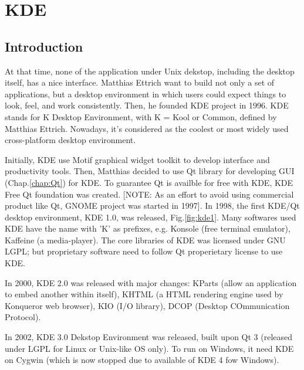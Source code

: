 \chapter{KDE}

\section{Introduction}

At that time, none of the application under Unix dekstop, including the desktop
itself, has a nice interface. Matthias Ettrich want to build not only a set of
applications, but a desktop environment in which users could expect things to
look, feel, and work consistently. Then, he founded KDE project in 1996. KDE
stands for K Desktop Environment, with K = Kool or Common, defined by Matthias
Ettrich. Nowadays, it's considered as the coolest or most widely used
cross-platform desktop environment.

Initially, KDE use Motif graphical widget toolkit to develop interface and
productivity tools. Then, Matthias decided to use Qt library for developing GUI
(Chap.\ref{chap:Qt}) for KDE. To guarantee Qt is availble for free with KDE, KDE
Free Qt foundation was created. [NOTE: As an effort to avoid using commercial
product like Qt, GNOME project was started in 1997]. In 1998, the first KDE/Qt
desktop environment, KDE 1.0, was released, Fig.\ref{fig:kde1}.
Many softwares used KDE have the name with 'K' as prefixes, e.g. Konsole (free
terminal emulator), Kaffeine (a media-player). The core libraries of KDE was
licensed under GNU LGPL; but proprietary software need to follow Qt properietary
license to use KDE.


In 2000, KDE 2.0 was released with major changes: KParts (allow an application
to embed another within itself), KHTML (a HTML rendering engine used by
Konqueror web browser), KIO (I/O library), DCOP (Desktop COmmunication
Protocol).

In 2002, KDE 3.0 Dekstop Environment was released, built upon Qt 3 (released
under LGPL for Linux or Unix-like OS only). To run on Windows, it need KDE on
Cygwin (which is now stopped due to available of KDE 4 fow Windows).


